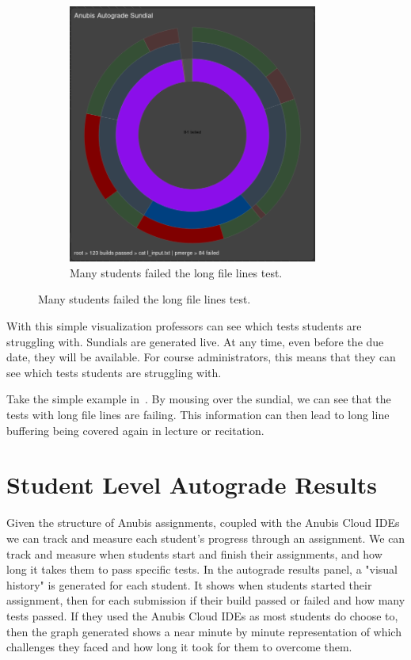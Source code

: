 \begin{figure}[ht]
\begin{subfigure}{0.5\textwidth}
        \includegraphics[width=0.9\textwidth]{figures/sundial-3}
        \caption{Many students failed the long file lines test.\label{fig:autograde-sundial-3} }
    \end{subfigure}
\end{figure}

With this simple visualization professors can see which tests students are struggling with.
Sundials are generated live.
At any time, even before the due date, they will be available.
For course administrators, this means that they can see which tests students are struggling with.


Take the simple example in~.
By mousing over the sundial, we can see that the tests with long file lines are failing.
This information can then lead to long line buffering being covered again in lecture or
recitation.

\section{Student Level Autograde Results}\label{sec:student-level-results}

Given the structure of Anubis assignments, coupled with the Anubis Cloud IDEs we can
track and measure each student's progress through an assignment.
We can track and measure when students start and finish their assignments,
and how long it takes them to pass specific tests.
In the autograde results panel, a "visual history" is generated for each student.
It shows when students started their assignment, then for each submission if their
build passed or failed and how many tests passed.
If they used the Anubis Cloud IDEs as most students do choose to,
then the graph generated shows a near minute by minute representation of which
challenges they faced and how long it took for them to overcome them.

